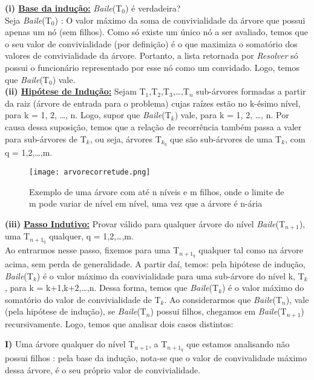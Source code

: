 \documentclass[a4paper]{article}
\begin{document}
\textbf{(i) \underline{Base da indução:}} \emph{Baile}(T$_{0}$) é verdadeira?\\
\qquad Seja \emph{Baile}(T$_0$) : O valor máximo da soma de convivialidade da árvore que possui apenas um nó (sem filhos). Como só existe um único nó a ser avaliado, temos que o seu valor de convivialidade (por definição) é o que maximiza o somatório dos valores de convivialidade da árvore. Portanto, a lista retornada por \emph{Resolver} só possui o funcionário representado por esse nó como um convidado. Logo, temos que \emph{Baile}(T$_{0}$) vale.\\

\textbf{(ii) \underline{Hipótese de Indução:}} Sejam  T$_{1}$,T$_{2}$,T$_{3}$,\ldots,T$_{n}$ sub-árvores formadas a partir da raiz (árvore de entrada para o problema) cujas raízes estão no k-ésimo nível, para k = 1, 2, \ldots, n. Logo, supor que \emph{Baile}(T$_k$) vale, para k = 1, 2, \ldots, n. Por causa dessa suposição, temos que a relação de recorrência também passa a valer para sub-árvores de T$_k$, ou seja, árvores T$_{k_q}$ que são sub-árvores de uma T$_k$, com q = 1,2,\ldots,m.\\

\begin{figure}[!htb]
\centering
\texttt{[image: arvorecorretude.png]}
\caption{Exemplo de uma árvore com até n níveis e m filhos, onde o limite de m pode variar de nível em nível, uma vez que a árvore é n-ária}
\label{arvorecorretude}
\end{figure}

\textbf{(iii) \underline{Passo Indutivo:}} Provar válido para qualquer árvore do nível \emph{Baile}(T$_{n+1}$), uma T$_{n+1_q}$ qualquer, q = 1,2,\ldots,m.\\
Ao entrarmos nesse passo, fixemos para uma T$_{n+1_q}$ qualquer tal como na árvore acima, sem perda de generalidade. A partir daí, temos:
pela hipótese de indução, \emph{Baile}(T$_k$) é o valor máximo da convivialidade para uma sub-árvore do nível k, T$_{k}$, para k = k+1,k+2,\ldots,n. Dessa forma, temos que \emph{Baile}(T$_k$) é o valor máximo do somatório do valor de convivialidade de T$_k$. Ao considerarmos que \emph{Baile}(T$_n$), vale (pela hipótese de indução), se \emph{Baile}(T$_n$) possui filhos, chegamos em \emph{Baile}(T$_{n+1}$) recursivamente. Logo, temos que analisar dois casos distintos:

\textbf{I)} Uma árvore qualquer do nível T$_{n+1}$, a T$_{n+1_q}$ que estamos analisando não possui filhos : pela base da indução, nota-se que o valor de convivalidade máximo dessa árvore, é o seu próprio valor de convivialidade.
\end{document}
